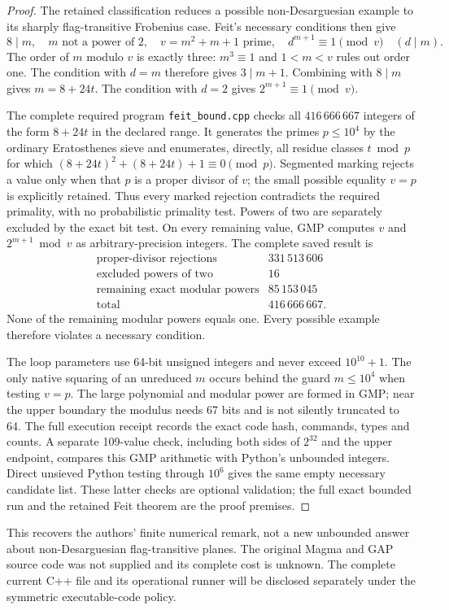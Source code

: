 \begin{proof}
The retained classification reduces a possible non-Desarguesian example
to its sharply flag-transitive Frobenius case. Feit's necessary conditions
then give
\[
 8\mid m,\quad m\text{ not a power of }2,\quad
 v=m^2+m+1\text{ prime},\quad d^{m+1}\equiv1\pmod v
 \quad(d\mid m).
\]
The order of $m$ modulo $v$ is exactly three: $m^3\equiv1$ and
$1<m<v$ rules out order one. The condition with $d=m$ therefore gives
$3\mid m+1$. Combining with $8\mid m$ gives $m=8+24t$. The condition
with $d=2$ gives $2^{m+1}\equiv1\pmod v$.

The complete required program \texttt{feit\_bound.cpp} checks all
$416\,666\,667$ integers of the form $8+24t$ in the declared range.
It generates the primes $p\leq10^4$ by the ordinary Eratosthenes sieve
and enumerates, directly, all residue classes $t\bmod p$ for which
$(8+24t)^2+(8+24t)+1\equiv0\pmod p$. Segmented marking rejects a value
only when that $p$ is a proper divisor of $v$; the small possible equality
$v=p$ is explicitly retained. Thus every marked rejection contradicts the
required primality, with no probabilistic primality test. Powers of two
are separately excluded by the exact bit test. On every remaining value,
GMP computes $v$ and $2^{m+1}\bmod v$ as arbitrary-precision integers.
The complete saved result is
\[
\begin{array}{lr}
\text{proper-divisor rejections}&331\,513\,606\\
\text{excluded powers of two}&16\\
\text{remaining exact modular powers}&85\,153\,045\\\hline
\text{total}&416\,666\,667.
\end{array}
\]
None of the remaining modular powers equals one. Every possible example
therefore violates a necessary condition.

The loop parameters use 64-bit unsigned integers and never exceed
$10^{10}+1$. The only native squaring of an unreduced $m$ occurs behind
the guard $m\leq10^4$ when testing $v=p$. The large polynomial and modular
power are formed in GMP; near the upper boundary the modulus needs 67
bits and is not silently truncated to 64. The full execution receipt
records the exact code hash, commands, types and counts. A separate
109-value check, including both sides of $2^{32}$ and the upper endpoint,
compares this GMP arithmetic with Python's unbounded integers. Direct
unsieved Python testing through $10^6$ gives the same empty necessary
candidate list. These latter checks are optional validation; the full
exact bounded run and the retained Feit theorem are the proof premises.
\end{proof}

This recovers the authors' finite numerical remark, not a new unbounded
answer about non-Desarguesian flag-transitive planes. The original Magma
and GAP source code was not supplied and its complete cost is unknown.
The complete current C++ file and its operational runner will be disclosed
separately under the symmetric executable-code policy.
